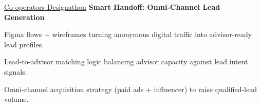 \begin{twocolentry}{\hspace{.5pt} \href{https://www.cooperators.ca/}{Co-operators Designathon}}
\textbf{Smart Handoff: Omni-Channel Lead Generation}
\end{twocolentry}
\begin{onecolentry}
\begin{highlights}
\item Figma flows + wireframes turning anonymous digital traffic into advisor-ready lead profiles.
\item Lead-to-advisor matching logic balancing advisor capacity against lead intent signals.
\item Omni-channel acquisition strategy (paid ads + influencer) to raise qualified-lead volume.
\end{highlights}
\end{onecolentry}
